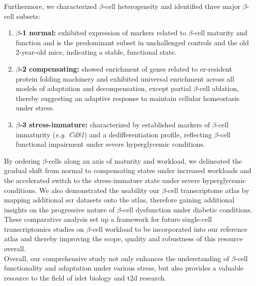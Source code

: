 \par Furthermore, we characterized $\beta$-cell heterogeneity and identified three major $\beta$-cell subsets:

\begin{enumerate}
    \item \textbf{$\beta$-1 normal:} exhibited expression of markers related to $\beta$-cell maturity and function and is the predominant subset in unchallenged controls and the old 2-year-old mice, indicating a stable, functional state.
    \item \textbf{$\beta$-2 compensating:} showed enrichment of genes related to \gls{er}-resident protein folding machinery and exhibited universal enrichment across all models of adaptation and decompensation, except partial $\beta$-cell ablation, thereby suggesting an adaptive response to maintain cellular homeostasis under stress.
    \item \textbf{$\beta$-3 stress-immature:} characterized by established markers of $\beta$-cell immaturity (\textit{e.g. Cd81}) and a dedifferentiation profile, reflecting $\beta$-cell functional impairment under severe hyperglycemic conditions.
\end{enumerate}

By ordering $\beta$-cells along an axis of maturity and workload, we delineated the gradual shift from normal to compensating states under increased workloads and the accelerated switch to the stress-immature state under severe hyperglycemic conditions. We also demonstrated the usability our $\beta$-cell transcriptome atlas by mapping additional \gls{scr} datasets onto the atlas, therefore gaining additional insights on the progressive nature of $\beta$-cell dysfunction under diabetic conditions. These comparative analysis set up a framework for future single-cell transcriptomics studies on $\beta$-cell workload to be incorporated into our reference atlas and thereby improving the scope, quality and robustness of this resource overall.\\

Overall, our comprehensive study not only enhances the understanding of $\beta$-cell functionality and adaptation under various stress, but also provides a valuable resource to the field of islet biology and \gls{t2d} research.

